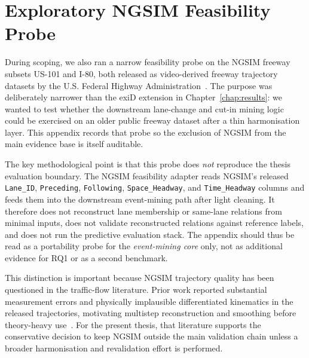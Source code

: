 \documentclass[12pt,a4paper,twoside,openright]{report}
\begin{document}
    \chapter{Exploratory NGSIM Feasibility Probe}
    \label{app:ngsim-feasibility}

    During scoping, we also ran a narrow feasibility probe on the NGSIM freeway subsets US-101 and I-80, both released as video-derived freeway trajectory datasets by the U.S. Federal Highway Administration~\cite{fhwa_us101_2007,fhwa_i80_2006}. The purpose was deliberately narrower than the exiD extension in Chapter~\ref{chap:results}: we wanted to test whether the downstream lane-change and cut-in mining logic could be exercised on an older public freeway dataset after a thin harmonisation layer. This appendix records that probe so the exclusion of NGSIM from the main evidence base is itself auditable.

    The key methodological point is that this probe does \emph{not} reproduce the thesis evaluation boundary. The NGSIM feasibility adapter reads NGSIM's released \texttt{Lane\_ID}, \texttt{Preceding}, \texttt{Following}, \texttt{Space\_Headway}, and \texttt{Time\_Headway} columns and feeds them into the downstream event-mining path after light cleaning. It therefore does not reconstruct lane membership or same-lane relations from minimal inputs, does not validate reconstructed relations against reference labels, and does not run the predictive evaluation stack. The appendix should thus be read as a portability probe for the \emph{event-mining core} only, not as additional evidence for RQ1 or as a second benchmark.

    This distinction is important because NGSIM trajectory quality has been questioned in the traffic-flow literature. Prior work reported substantial measurement errors and physically implausible differentiated kinematics in the released trajectories, motivating multistep reconstruction and smoothing before theory-heavy use~\cite{punzo2011ngsim,montanino2013ngsim,coifman2017ngsim}. For the present thesis, that literature supports the conservative decision to keep NGSIM outside the main validation chain unless a broader harmonisation and revalidation effort is performed.
\end{document}
